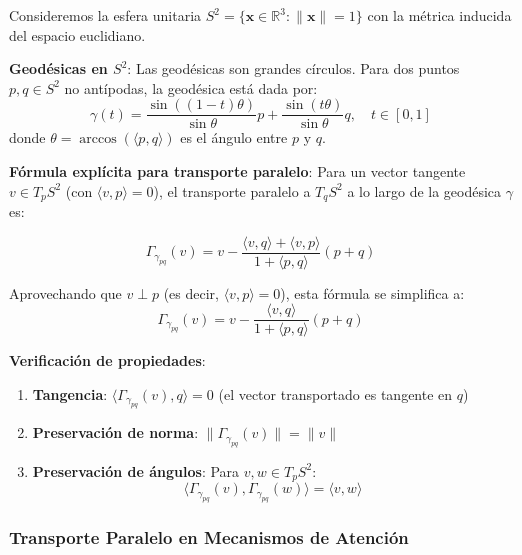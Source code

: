 \begin{example}\label{ex:parallel_transport_sphere}
Consideremos la esfera unitaria $S^2 = \{\mathbf{x} \in \mathbb{R}^3 : \|\mathbf{x}\| = 1\}$ con la métrica inducida del espacio euclidiano.

\textbf{Geodésicas en $S^2$}: Las geodésicas son grandes círculos. Para dos puntos $p, q \in S^2$ no antípodas, la geodésica está dada por:
\begin{equation}
\gamma(t) = \frac{\sin((1-t)\theta)}{\sin\theta} p + \frac{\sin(t\theta)}{\sin\theta} q, \quad t \in [0,1]
\end{equation}
donde $\theta = \arccos(\langle p, q \rangle)$ es el ángulo entre $p$ y $q$.

\textbf{Fórmula explícita para transporte paralelo}: Para un vector tangente $v \in T_p S^2$ (con $\langle v, p \rangle = 0$), el transporte paralelo a $T_q S^2$ a lo largo de la geodésica $\gamma$ es:

\begin{equation}
\Gamma_{\gamma_{pq}}(v) = v - \frac{\langle v, q \rangle + \langle v, p \rangle}{1 + \langle p, q \rangle}(p + q)
\label{eq:parallel_transport_sphere_formula}
\end{equation}

Aprovechando que $v \perp p$ (es decir, $\langle v, p \rangle = 0$), esta fórmula se simplifica a:
\begin{equation}
\Gamma_{\gamma_{pq}}(v) = v - \frac{\langle v, q \rangle}{1 + \langle p, q \rangle}(p + q)
\end{equation}

\textbf{Verificación de propiedades}:
\begin{enumerate}
    \item \textbf{Tangencia}: $\langle \Gamma_{\gamma_{pq}}(v), q \rangle = 0$ (el vector transportado es tangente en $q$)
    \item \textbf{Preservación de norma}: $\|\Gamma_{\gamma_{pq}}(v)\| = \|v\|$
    \item \textbf{Preservación de ángulos}: Para $v, w \in T_p S^2$:
    \begin{equation}
    \langle \Gamma_{\gamma_{pq}}(v), \Gamma_{\gamma_{pq}}(w) \rangle = \langle v, w \rangle
    \end{equation}
\end{enumerate}
\end{example}

\subsubsection{Transporte Paralelo en Mecanismos de Atención}

